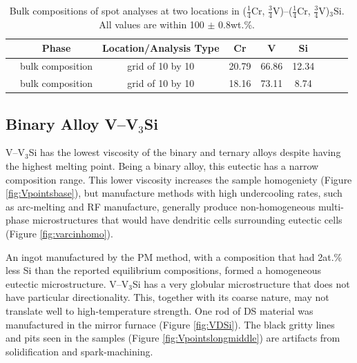 \begin{table}[htdp]
\begin{center}
\begin{tabular}{lcccccccc}
\hline
			& Phase &Location/Analysis Type		&   Cr    		&  V 		      & Si   	\\
\hline
\hline
			
				&bulk composition	&grid of 10 by 10		&20.79			&66.86			&12.34\\ 
				& bulk composition	&grid of 10 by 10		&18.16			&73.11			&8.74\\			
\hline
\end{tabular}
\end{center}
\caption{Bulk compositions of spot analyses at two locations in ($\frac{1}{4}$Cr, $\frac{3}{4}$V)--($\frac{1}{4}$Cr, $\frac{3}{4}$V)$_3$Si.  All values are within 100 $\pm$ 0.8wt.\%.}
\label{tab:quartCrbulk}
\end{table}

\subsection{Binary Alloy V--V$_3$Si}

V--V$_3$Si has the lowest viscosity of the binary and ternary alloys despite having the highest melting point.  Being a binary alloy, this eutectic has a narrow composition range.  This lower viscosity increases the sample homogeniety (Figure \ref{fig:Vpointsbase}), but manufacture methods with high undercooling rates, such as arc-melting and RF manufacture, generally produce non-homogeneous multi-phase microstructures that would have dendritic cells surrounding eutectic cells (Figure \ref{fig:varcinhomo}).  

An ingot manufactured by the PM method, with a composition that had 2at.\% less Si than the reported equilibrium compositions, formed a homogeneous eutectic microstructure.  V--V$_3$Si has a very globular microstructure that does not have particular directionality.  This, together with its coarse nature, may not translate well to high-temperature strength.  One rod of DS material was manufactured in the mirror furnace (Figure \ref{fig:VDSi}).  The black gritty lines and pits seen in the samples (Figure \ref{fig:Vpointslongmiddle}) are artifacts from solidification and spark-machining.  

